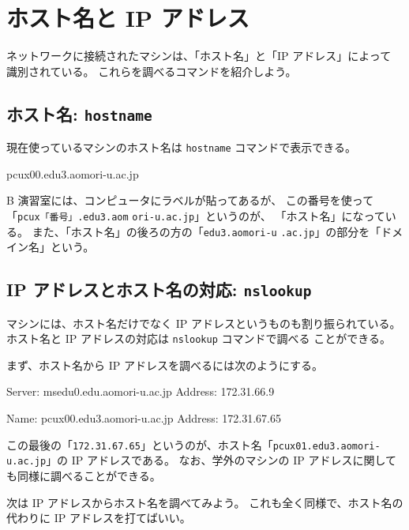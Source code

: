 \newpage

\section{ホスト名と IP アドレス}

ネットワークに接続されたマシンは、「ホスト名」と「IP アドレス」によって
識別されている。
これらを調べるコマンドを紹介しよう。

\subsection{ホスト名: \texttt{hostname}}

現在使っているマシンのホスト名は \texttt{hostname} コマンドで表示できる。

\begin{progls}
pcux00.edu3.aomori-u.ac.jp
%
\end{progls}

 B 演習室には、コンピュータにラベルが貼ってあるが、
この番号を使って
「\texttt{pcux「番号」.edu3.aom}
\texttt{ori-u.ac.jp}」というのが、
「ホスト名」になっている。
また、「ホスト名」の後ろの方の「\texttt{edu3.aomori-u}
\texttt{.ac.jp}」の部分を「ドメイン名」という。

\subsection{IP アドレスとホスト名の対応: \texttt{nslookup}}

マシンには、ホスト名だけでなく IP アドレスというものも割り振られている。
ホスト名と IP アドレスの対応は \texttt{nslookup} コマンドで調べる
ことができる。

まず、ホスト名から IP アドレスを調べるには次のようにする。

\begin{progls}
Server:  msedu0.edu.aomori-u.ac.jp
Address:  172.31.66.9

Name:    pcux00.edu3.aomori-u.ac.jp
Address:  172.31.67.65
%
\end{progls}

この最後の「\texttt{172.31.67.65}」というのが、ホスト名「\texttt{pcux01.edu3.aomori-u.ac.jp}」の IP アドレスである。
なお、学外のマシンの IP アドレスに関しても同様に調べることができる。

\bigskip

次は IP アドレスからホスト名を調べてみよう。
これも全く同様で、ホスト名の代わりに IP アドレスを打てばいい。

